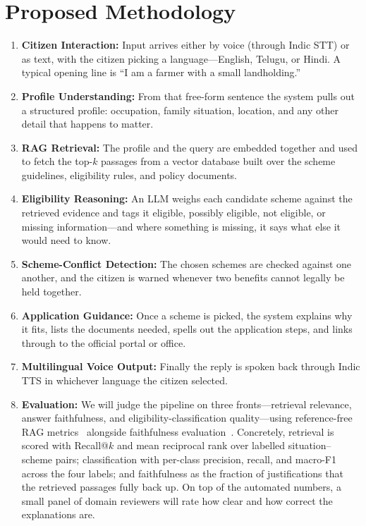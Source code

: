 \documentclass[conference]{IEEEtran}
\begin{document}
\section{Proposed Methodology}
\label{sec:method}
\begin{enumerate}
\item \textbf{Citizen Interaction:} Input arrives either by voice (through Indic STT) or as text, with the citizen picking a language---English, Telugu, or Hindi. A typical opening line is ``I am a farmer with a small landholding.''
\item \textbf{Profile Understanding:} From that free-form sentence the system pulls out a structured profile: occupation, family situation, location, and any other detail that happens to matter.
\item \textbf{RAG Retrieval:} The profile and the query are embedded together and used to fetch the top-$k$ passages from a vector database built over the scheme guidelines, eligibility rules, and policy documents.
\item \textbf{Eligibility Reasoning:} An LLM weighs each candidate scheme against the retrieved evidence and tags it eligible, possibly eligible, not eligible, or missing information---and where something is missing, it says what else it would need to know.
\item \textbf{Scheme-Conflict Detection:} The chosen schemes are checked against one another, and the citizen is warned whenever two benefits cannot legally be held together.
\item \textbf{Application Guidance:} Once a scheme is picked, the system explains why it fits, lists the documents needed, spells out the application steps, and links through to the official portal or office.
\item \textbf{Multilingual Voice Output:} Finally the reply is spoken back through Indic TTS in whichever language the citizen selected.
\item \textbf{Evaluation:} We will judge the pipeline on three fronts---retrieval relevance, answer faithfulness, and eligibility-classification quality---using reference-free RAG metrics~\cite{es2024ragas} alongside faithfulness evaluation~\cite{filice2025awf}. Concretely, retrieval is scored with Recall@$k$ and mean reciprocal rank over labelled situation--scheme pairs; classification with per-class precision, recall, and macro-F1 across the four labels; and faithfulness as the fraction of justifications that the retrieved passages fully back up. On top of the automated numbers, a small panel of domain reviewers will rate how clear and how correct the explanations are.
\end{enumerate}
\end{document}
